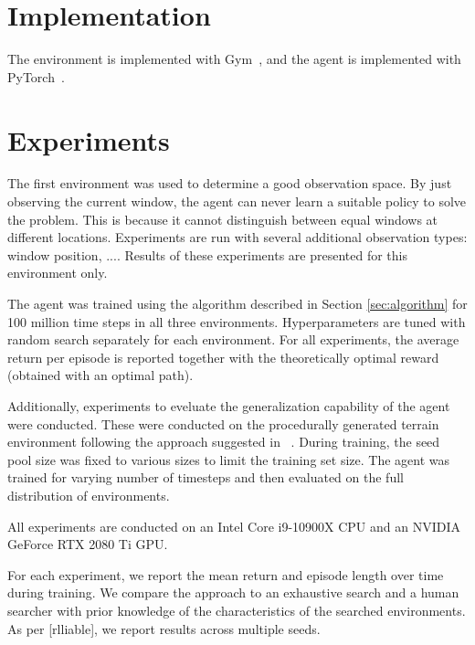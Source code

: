 


\section{Implementation}

The environment is implemented with Gym~\cite{gym}, and the agent is implemented with PyTorch~\cite{pytorch}. 

\section{Experiments}

The first environment was used to determine a good observation space. By just observing the current window, the agent can never learn a suitable policy to solve the problem. This is because it cannot distinguish between equal windows at different locations. Experiments are run with several additional observation types: window position, .... Results of these experiments are presented for this environment only.

The agent was trained using the algorithm described in Section \ref{sec:algorithm} for 100 million time steps in all three environments. Hyperparameters are tuned with random search separately for each environment. For all experiments, the average return per episode is reported together with the theoretically optimal reward (obtained with an optimal path).

Additionally, experiments to eveluate the generalization capability of the agent were conducted. These were conducted on the procedurally generated terrain environment following the approach suggested in ~\cite{procgen}. During training, the seed pool size was fixed to various sizes to limit the training set size. The agent was trained for varying number of timesteps and then evaluated on the full distribution of environments.

All experiments are conducted on an Intel Core i9-10900X CPU and an NVIDIA GeForce RTX 2080 Ti GPU.

For each experiment, we report the mean return and episode length over time during training. We compare the approach to an exhaustive search and a human searcher with prior knowledge of the characteristics of the searched environments. As per [rlliable], we report results across multiple seeds.

